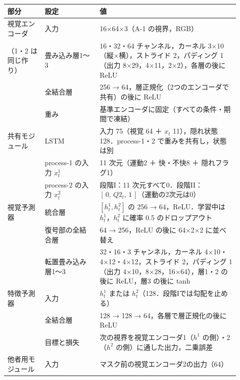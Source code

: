 \begin{tabular}{@{}p{0.15\linewidth}p{0.22\linewidth}p{0.56\linewidth}@{}}
\toprule
部分 & 設定 & 値 \\
\midrule
視覚エンコーダ & 入力 & 16×64×3（A-1 の視界，RGB） \\
（1・2 は同じ作り） & 畳み込み層1〜3 & 16・32・64 チャンネル，カーネル 3×10（縦×横），ストライド 2，パディング 1（出力 8×29，4×11，2×2），各層の後に ReLU \\
 & 全結合層 & 256 → 64，層正規化（2つのエンコーダで共有）の後に ReLU \\
 & 重み & 基準エンコーダに固定（すべての条件・期間で凍結） \\
\midrule
共有モジュール & LSTM & 入力 75（視覚 64 ＋ $x_t$ 11），隠れ状態 128．process-1・2 で重みを共有し，状態は別 \\
 & process-1 の入力 $x^1_t$ & 11 次元（運動2 ＋ 快・不快8 ＋ 隠れフラグ1） \\
 & process-2 の入力 $x^2_t$ & 段階I：11 次元すべて0．段階II：$[\,0,\,Q2_t,\,1\,]$（運動の2次元は0） \\
\midrule
視覚予測器 & 統合層 & $[h^1_t,h^2_t]$ の 256 → 64，ReLU．学習中は $h^1_t$，$h^2_t$ に確率 0.5 のドロップアウト \\
 & 復号部の全結合層 & 64 → 256，ReLU の後に 64×2×2 に並べ替え \\
 & 転置畳み込み層1〜3 & 32・16・3 チャンネル，カーネル 4×10・4×12・4×12，ストライド 2，パディング 1（出力 4×10，8×28，16×64），層1・2 の後に ReLU，層3 の後に tanh \\
\midrule
特徴予測器 & 入力 & $h^1_t$ または $h^2_t$（128．段階Iでは勾配を止める） \\
 & 全結合層 & 128 → 128 → 64，各層で層正規化の後に ReLU \\
 & 目標と損失 & 次の視界を視覚エンコーダ1（$h^1$ の側）・2（$h^2$ の側）に通した出力，二乗誤差 \\
\midrule
他者用モジュール & 入力 & マスク前の視覚エンコーダ2の出力（64） \\

\end{tabular}
